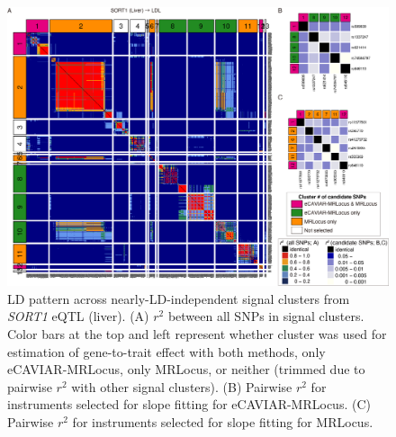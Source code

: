 \documentclass[11pt]{article}
\begin{document}
\begin{figure}[!ht]
  \centering
  \includegraphics[width=\textwidth]{figs/region/heatmap_eQTLbase.Liver_SORT1_LDL.20210114.png}
  \caption{LD pattern across nearly-LD-independent signal clusters
    from \emph{SORT1} eQTL (liver).
    (A) $r^2$ between all SNPs in signal clusters. Color bars at the
    top and left represent whether cluster was used for estimation of
    gene-to-trait effect with both methods, only eCAVIAR-MRLocus, only
    MRLocus, or neither (trimmed due to pairwise $r^2$ with other
    signal clusters). (B) Pairwise $r^2$ for instruments selected for
    slope fitting for eCAVIAR-MRLocus. (C) Pairwise $r^2$ for
    instruments selected for slope fitting for MRLocus.}
\end{figure}
\end{document}
